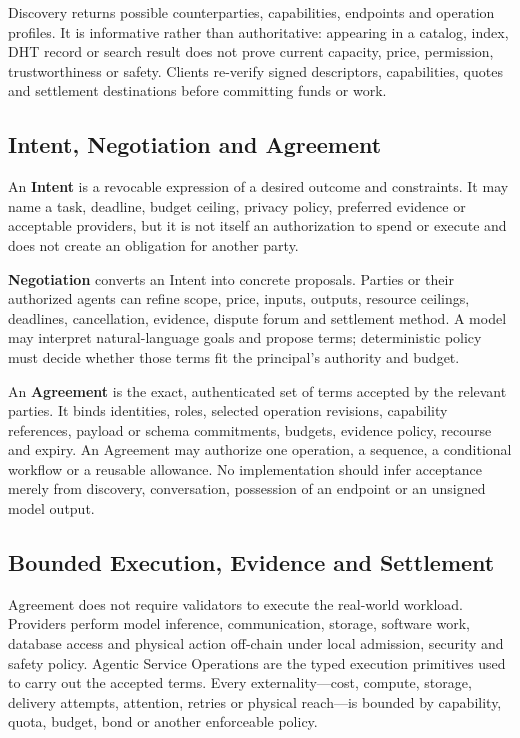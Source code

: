 \documentclass[11pt,oneside]{article}
\begin{document}
Discovery returns possible counterparties, capabilities, endpoints and operation profiles.
It is informative rather than authoritative: appearing in a catalog, index, DHT record or
search result does not prove current capacity, price, permission, trustworthiness or safety.
Clients re-verify signed descriptors, capabilities, quotes and settlement destinations before
committing funds or work.

\subsection{Intent, Negotiation and Agreement}

An \textbf{Intent} is a revocable expression of a desired outcome and constraints. It may name
a task, deadline, budget ceiling, privacy policy, preferred evidence or acceptable providers,
but it is not itself an authorization to spend or execute and does not create an obligation
for another party.

\textbf{Negotiation} converts an Intent into concrete proposals. Parties or their authorized
agents can refine scope, price, inputs, outputs, resource ceilings, deadlines, cancellation,
evidence, dispute forum and settlement method. A model may interpret natural-language goals
and propose terms; deterministic policy must decide whether those terms fit the principal's
authority and budget.

An \textbf{Agreement} is the exact, authenticated set of terms accepted by the relevant
parties. It binds identities, roles, selected operation revisions, capability references,
payload or schema commitments, budgets, evidence policy, recourse and expiry. An Agreement
may authorize one operation, a sequence, a conditional workflow or a reusable allowance. No
implementation should infer acceptance merely from discovery, conversation, possession of an
endpoint or an unsigned model output.

\subsection{Bounded Execution, Evidence and Settlement}

Agreement does not require validators to execute the real-world workload. Providers perform
model inference, communication, storage, software work, database access and physical action
off-chain under local admission, security and safety policy. Agentic Service Operations are
the typed execution primitives used to carry out the accepted terms. Every externality---cost,
compute, storage, delivery attempts, attention, retries or physical reach---is bounded by
capability, quota, budget, bond or another enforceable policy.
\end{document}
